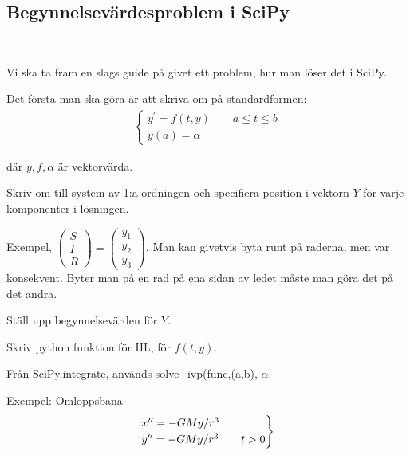 \subsection{Begynnelsevärdesproblem i SciPy}\hfill\\
\par\bigskip
\noindent Vi ska ta fram en slags guide på givet ett problem, hur man löser det i SciPy.
\par\bigskip
\noindent Det första man ska göra är att skriva om på standardformen:
\begin{equation*}
  \begin{gathered}
    \begin{cases*}
      y^{\prime} = f(t,y)\qquad a\leq t\leq b\\
      y(a) = \alpha
    \end{cases*}
  \end{gathered}
\end{equation*}
\par\bigskip
\noindent där $y,f, \alpha$ är vektorvärda.
\par\bigskip
\noindent Skriv om till system av 1:a ordningen och specifiera position i vektorn $Y$ för varje komponenter i lösningen.\par\bigskip
\noindent Exempel, $\begin{pmatrix}S\\I\\R\end{pmatrix} = \begin{pmatrix}y_1\\y_2\\y_3\end{pmatrix}$. Man kan givetvis byta runt på raderna, men var konsekvent. Byter man på en rad på ena sidan av ledet måste man göra det på det andra.
\par\bigskip
\noindent Ställ upp begynnelsevärden för $Y$.
\par\bigskip
\noindent Skriv python funktion för HL, för $f(t,y)$. 
\par\bigskip
\noindent Från SciPy.integrate, används solve\_ivp(func,(a,b), $\alpha$.
\par\bigskip
\noindent Exempel: Omloppsbana
\begin{equation*}
  \begin{gathered}
    \begin{rcases*}
      x^{\prime\prime}=-GMy/r^3\\
      y^{\prime\prime}=-GMy/r^3\qquad t>0
    \end{rcases*}
  \end{gathered}
\end{equation*}\par
